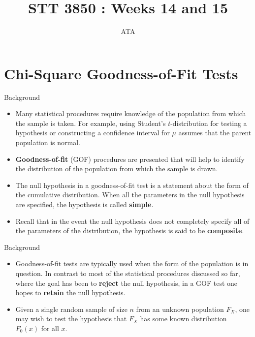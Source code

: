 \documentclass[
  ignorenonframetext,
]{beamer}
\title{STT 3850 : Weeks 14 and 15}
\author{ATA}
\date{}
\institute{Appalachian State University}
\begin{document}
\frame{\titlepage}

\section{Chi-Square Goodness-of-Fit
Tests}\label{chi-square-goodness-of-fit-tests}

\begin{frame}{Background}
\label{background}
\begin{itemize}
\item
  Many statistical procedures require knowledge of the population from
  which the sample is taken. For example, using Student's
  \(t\)-distribution for testing a hypothesis or constructing a
  confidence interval for \(\mu\) assumes that the parent population is
  normal.
\item
  \textbf{Goodness-of-fit} (GOF) procedures are presented that will help
  to identify the distribution of the population from which the sample
  is drawn.
\item
  The null hypothesis in a goodness-of-fit test is a statement about the
  form of the cumulative distribution. When all the parameters in the
  null hypothesis are specified, the hypothesis is called
  \textbf{simple}.
\item
  Recall that in the event the null hypothesis does not completely
  specify all of the parameters of the distribution, the hypothesis is
  said to be \textbf{composite}.
\end{itemize}
\end{frame}

\begin{frame}{Background}
\label{background-1}
\begin{itemize}
\item
  Goodness-of-fit tests are typically used when the form of the
  population is in question. In contrast to most of the statistical
  procedures discussed so far, where the goal has been to
  \textbf{reject} the null hypothesis, in a GOF test one hopes to
  \textbf{retain} the null hypothesis.
\item
  Given a single random sample of size \(n\) from an unknown population
  \(F_X\), one may wish to test the hypothesis that \(F_X\) has some
  known distribution \(F_0(x)\) for all \(x\).
\end{itemize}
\end{frame}
\end{document}
